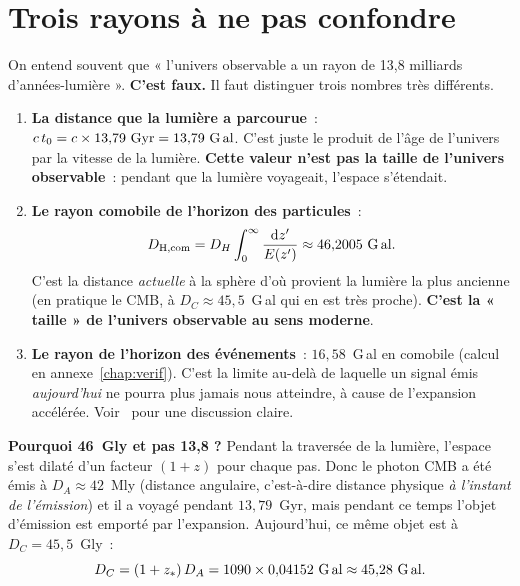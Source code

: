 \documentclass[11pt,a4paper,openany]{report}
\newcommand{\dif}{\mathrm{d}}
\newcommand{\Gly}{\text{G\,al}}
\newcommand{\Gyr}{\text{Gyr}}
\begin{document}
\section{Trois rayons à ne pas confondre}

\begin{tcolorbox}[attention]
On entend souvent que « l'univers observable a un rayon de
13{,}8 milliards d'années-lumière ». \textbf{C'est faux.} Il faut distinguer
trois nombres très différents.
\end{tcolorbox}

\begin{enumerate}
\item \textbf{La distance que la lumière a parcourue}~:
$c\,t_0 = c \times 13{,}79~\Gyr = 13{,}79~\Gly$. C'est juste le produit de
l'âge de l'univers par la vitesse de la lumière. \textbf{Cette valeur n'est
pas la taille de l'univers observable}~: pendant que la lumière voyageait,
l'espace s'étendait.

\item \textbf{Le rayon comobile de l'horizon des particules}~:
\[
D_{\text{H,com}} = D_{H}\int_{0}^{\infty}\frac{\dif z'}{E(z')} \approx 46{,}2005~\Gly.
\]
C'est la distance \emph{actuelle} à la sphère d'où provient la lumière la plus
ancienne (en pratique le CMB, à $D_C \approx 45{,}5$~G\,al qui en est très
proche). \textbf{C'est la « taille » de l'univers observable au sens
moderne}.

\item \textbf{Le rayon de l'horizon des événements}~:
$16{,}58$~G\,al en comobile (calcul en annexe~\ref{chap:verif}). C'est la limite au-delà de laquelle un signal
émis \emph{aujourd'hui} ne pourra plus jamais nous atteindre, à cause de
l'expansion accélérée. Voir~\cite{Davis2004} pour une discussion claire.
\end{enumerate}

\begin{tcolorbox}[mathspe]
\textbf{Pourquoi 46~Gly et pas 13{,}8 ?} Pendant la traversée de la
lumière, l'espace s'est dilaté d'un facteur $(1+z)$ pour chaque pas. Donc le
photon CMB a été émis à $D_A \approx 42$~Mly (distance angulaire, c'est-à-dire
distance physique \emph{à l'instant de l'émission}) et il a voyagé pendant
$13{,}79$~Gyr, mais pendant ce temps l'objet d'émission est emporté par
l'expansion. Aujourd'hui, ce même objet est à $D_C = 45{,}5$~Gly~:
\[
D_C = (1+z_*)\,D_A = 1090 \times 0{,}04152~\Gly \approx 45{,}28~\Gly.
\]
\end{tcolorbox}
\end{document}
